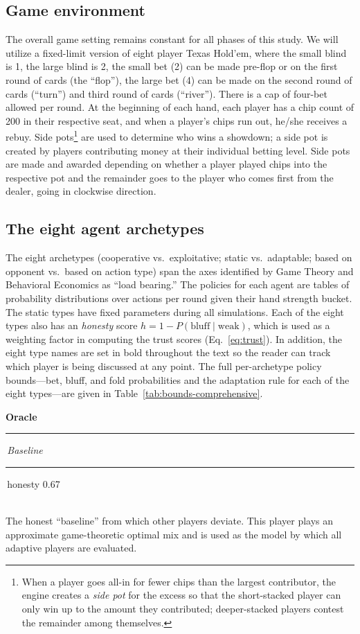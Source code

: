 \documentclass[10pt]{article} %
\newcommand{\arch}[1]{\textbf{#1}}
\newcommand{\bbar}{\,\rule[-0.5pt]{0.5pt}{8pt}\,}
\newcommand{\archentry}[4]{%
  \par\vspace{5pt}\noindent
  {\sffamily\fontsize{10}{12}\selectfont\arch{#1}\bbar\textit{#2}\bbar honesty #3}\\[1pt]
  \small #4\par}
\begin{document}
\subsection{Game environment}
The overall game setting remains constant for all phases of this
study. We will utilize a fixed-limit version of eight player Texas
Hold'em, where the small blind is 1, the large blind is 2, the small
bet (2) can be made pre-flop or on the first round of cards (the
``flop''), the large bet (4) can be made on the
second round of cards (``turn'') and third round of cards
(``river''). There is a cap of four-bet allowed per round. At the beginning of each
hand, each player has a chip count of 200 in their respective seat,
and when a player's chips run out, he/she receives a rebuy. Side
pots\footnote{When a player goes all-in for fewer chips than the
largest contributor, the engine creates a \textit{side pot} for the
excess so that the short-stacked player can only win up to the
amount they contributed; deeper-stacked players contest the
remainder among themselves.} are used to determine who wins a
showdown; a side pot is created by
players contributing money at their individual betting level. Side
pots are made and awarded depending on whether a player played chips
into the respective pot and the remainder goes to the player who
comes first from the dealer, going in clockwise direction.

\subsection{The eight agent archetypes}\label{sec:archetypes}
The eight archetypes (cooperative vs.\ exploitative; static vs.\
adaptable; based on opponent vs.\ based on action type) span the
axes identified by Game Theory and Behavioral Economics as ``load
bearing.'' The policies for each agent are tables of probability
distributions over actions per round given their hand strength
bucket. The static types have fixed parameters during all
simulations. Each of the eight types also has an \textit{honesty}
score $h = 1 - P(\text{bluff}\mid\text{weak})$,
which is used as a weighting factor in computing the trust scores
(Eq.~\ref{eq:trust}). In addition, the eight type names are set in
bold throughout the text so the reader can track which player is
being discussed at any point. The full per-archetype policy
bounds---bet, bluff, and fold
probabilities and the adaptation rule for each of the eight
types---are given in Table~\ref{tab:bounds-comprehensive}.

\archentry{Oracle}{Baseline}{0.67}{%
  The honest ``baseline'' from which other players deviate. This
  player plays an approximate game-theoretic optimal mix and is used
  as the model by which all adaptive players are
  evaluated.}
\end{document}
